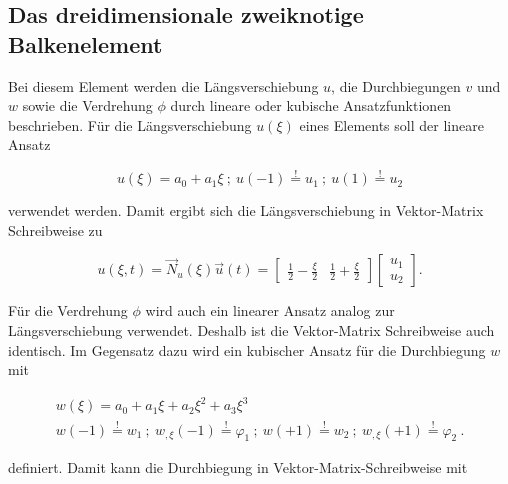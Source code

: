 	\subsection{Das dreidimensionale zweiknotige Balkenelement }\label{sec:3D-2.Knote-Balkenelment}
	Bei diesem Element werden die Längsverschiebung $ u $, die Durchbiegungen $ v $ und $ w $ sowie die Verdrehung $ \phi $ durch lineare oder kubische Ansatzfunktionen beschrieben. Für die Längsverschiebung $ u(\xi) $ eines Elements soll der lineare Ansatz
	
	\begin{equation}\label{equ:Linear-Einsatz}
	u(\xi)=a_{0}+a_{1}\xi \ ; \ u(-1) \overset{!}{=} u_{1} \ ; \  u(1) \overset{!}{=} u_{2}
	\end{equation}
	
	verwendet werden. Damit ergibt sich die Längsverschiebung in Vektor-Matrix Schreibweise zu
	
	\begin{equation}\label{equ:Linear-Einsatz-Algebra}
	u(\xi,t) = \vec{N}_{u}(\xi) \vec{u}(t) =
	\left[ \begin{array}{cc}
	\frac{1}{2} - \frac{\xi}{2} & \frac{1}{2} + \frac{\xi}{2}
	\end{array} \right]	
	\left[ 
	\begin{array}{c}
	u_{1}\\
	u_{2}
	\end{array} 
	\right] .
	\end{equation}
	
	Für die Verdrehung $ \phi $ wird auch ein linearer Ansatz analog zur Längsverschiebung verwendet. Deshalb ist die Vektor-Matrix Schreibweise auch identisch. Im Gegensatz dazu wird ein kubischer Ansatz für die Durchbiegung $ w $ mit
	
	\begin{equation}\label{equ:Kubik-Ansatz}
	\begin{array}{c}
	w(\xi) = a_{0} + a_{1}\xi + a_{2}\xi^{2} + a_{3}\xi^{3}\\
	w(-1)\overset{!}{=}w_{1} \ ; \ w_{,\xi}(-1)\overset{!}{=}\varphi_{1} \ ; \ w(+1)\overset{!}{=}w_{2} \ ; \ w_{,\xi}(+1)\overset{!}{=}\varphi_{2} \ .
	\end{array}
	\end{equation}
	
	definiert. Damit kann die Durchbiegung in Vektor-Matrix-Schreibweise mit
	
